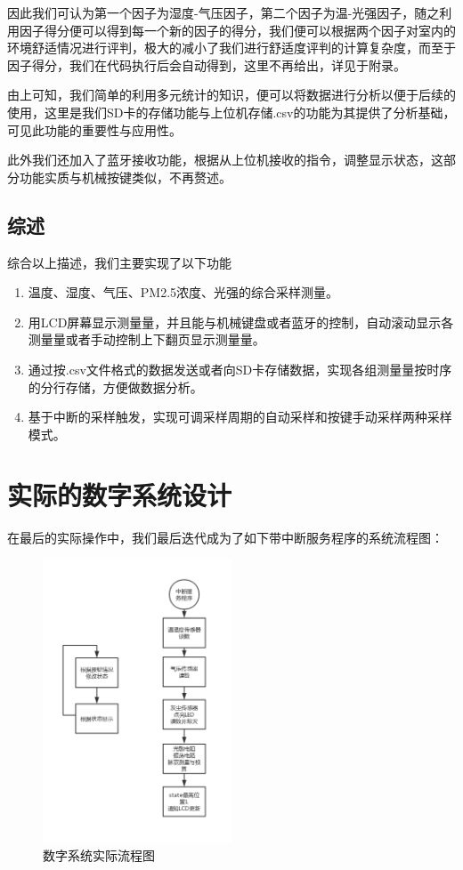 \documentclass[a4paper, 11pt]{article} %
\begin{document}
因此我们可认为第一个因子为湿度-气压因子，第二个因子为温-光强因子，随之利用因子得分便可以得到每一个新的因子的得分，我们便可以根据两个因子对室内的环境舒适情况进行评判，极大的减小了我们进行舒适度评判的计算复杂度，而至于因子得分，我们在代码执行后会自动得到，这里不再给出，详见于附录。

由上可知，我们简单的利用多元统计的知识，便可以将数据进行分析以便于后续的使用，这里是我们SD卡的存储功能与上位机存储.csv的功能为其提供了分析基础，可见此功能的重要性与应用性。

此外我们还加入了蓝牙接收功能，根据从上位机接收的指令，调整显示状态，这部分功能实质与机械按键类似，不再赘述。


\subsection{综述}

综合以上描述，我们主要实现了以下功能

\begin{enumerate}
  \item 温度、湿度、气压、PM2.5浓度、光强的综合采样测量。
  \item 用LCD屏幕显示测量量，并且能与机械键盘或者蓝牙的控制，自动滚动显示各测量量或者手动控制上下翻页显示测量量。
  \item 通过按.csv文件格式的数据发送或者向SD卡存储数据，实现各组测量量按时序的分行存储，方便做数据分析。
  \item 基于中断的采样触发，实现可调采样周期的自动采样和按键手动采样两种采样模式。
\end{enumerate}

\section{实际的数字系统设计}
\label{sec:digital_final}
在最后的实际操作中，我们最后迭代成为了如下带中断服务程序的系统流程图：

\begin{figure}[H]
  \centering
  \includegraphics[width = 0.5\textwidth]{digital_flow_real.png}
  \caption{数字系统实际流程图}
\end{figure}
\end{document}
